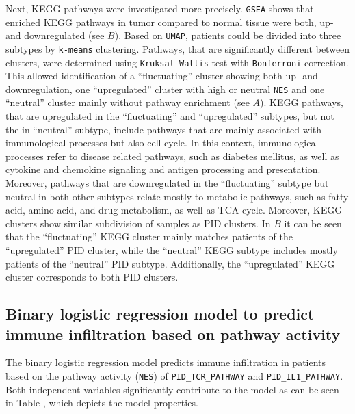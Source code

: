 \documentclass[
  parskip,
  oneside]{\documentclass[oneside]{book}}
\begin{document}
Next, KEGG pathways were investigated more precisely. \texttt{GSEA}
shows that enriched KEGG pathways in tumor compared to normal tissue
were both, up- and downregulated (see  \(B\)). Based on
\texttt{UMAP}, patients could be divided into three subtypes by
\texttt{k-means} clustering. Pathways, that are significantly different
between clusters, were determined using \texttt{Kruksal-Wallis} test
with \texttt{Bonferroni} correction. This allowed identification of a
``fluctuating'' cluster showing both up- and downregulation, one
``upregulated'' cluster with high or neutral \texttt{NES} and one
``neutral'' cluster mainly without pathway enrichment (see 
\(A\)). KEGG pathways, that are upregulated in the ``fluctuating'' and
``upregulated'' subtypes, but not the in ``neutral'' subtype, include
pathways that are mainly associated with immunological processes but
also cell cycle. In this context, immunological processes refer to
disease related pathways, such as diabetes mellitus, as well as cytokine
and chemokine signaling and antigen processing and presentation.\\
Moreover, pathways that are downregulated in the ``fluctuating'' subtype
but neutral in both other subtypes relate mostly to metabolic pathways,
such as fatty acid, amino acid, and drug metabolism, as well as TCA
cycle. Moreover, KEGG clusters show similar subdivision of samples as
PID clusters. In  \(B\) it can be seen that the
``fluctuating'' KEGG cluster mainly matches patients of the
``upregulated'' PID cluster, while the ``neutral'' KEGG subtype includes
mostly patients of the ``neutral'' PID subtype. Additionally, the
``upregulated'' KEGG cluster corresponds to both PID clusters.

\hypertarget{binary-logistic-regression-model-to-predict-immune-infiltration-based-on-pathway-activity}{%
\subsection{Binary logistic regression model to predict immune
infiltration based on pathway
activity}\label{binary-logistic-regression-model-to-predict-immune-infiltration-based-on-pathway-activity}}

The binary logistic regression model predicts immune infiltration in
patients based on the pathway activity (\texttt{NES}) of
\texttt{PID\_TCR\_PATHWAY} and \texttt{PID\_IL1\_PATHWAY}. Both
independent variables significantly contribute to the model as can be
seen in Table , which depicts the model properties.
\end{document}
